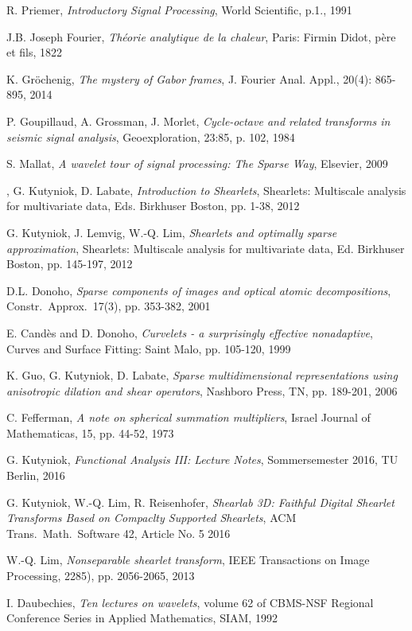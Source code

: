 \documentclass[11pt, english, singlespacing, headsepline, ]{MastersDoctoralThesis}
\theoremstyle{definition}
\begin{document}
\begin{thebibliography}{90}
	R. Priemer,
	\emph{Introductory Signal Processing},
	World Scientific, p.1.,
	1991

	J.B. Joseph Fourier,
	\emph{Théorie analytique de la chaleur},
	Paris: Firmin Didot, père et fils, 
	1822

	K. Gr\"ochenig,
	\emph{The mystery of Gabor frames},
	J. Fourier Anal. Appl., 20(4): 865-895,
	2014	

	P. Goupillaud, A. Grossman, J. Morlet,
	\emph{Cycle-octave and related transforms in seismic signal analysis},
	Geoexploration, 23:85, p. 102,
	1984

	S. Mallat,
	\emph{A wavelet tour of signal processing: The Sparse Way},
	Elsevier, 
	2009

,
	G. Kutyniok, D. Labate,
	\emph{Introduction to Shearlets},
	Shearlets: Multiscale analysis for multivariate data, Eds. Birkhuser Boston, pp. 1-38,
	2012

	G. Kutyniok, J. Lemvig, W.-Q. Lim,
	\emph{Shearlets and optimally sparse approximation},
	Shearlets: Multiscale analysis for multivariate data, Ed. Birkhuser Boston, pp. 145-197,
	2012

	D.L. Donoho,
	\emph{Sparse components of images and optical atomic decompositions},
	Constr.\ Approx.\, 17(3), pp. 353-382,
	2001

	E. Candès and D. Donoho,
	\emph{Curvelets - a surprisingly effective nonadaptive},
	Curves and Surface Fitting: Saint Malo, pp. 105-120,
	1999

	K. Guo, G. Kutyniok, D. Labate,
	\emph{Sparse multidimensional representations using anisotropic dilation and shear operators},
	Nashboro Press, TN, pp. 189-201,
	2006
	
	C. Fefferman, 
	\emph{A note on spherical summation multipliers},
	Israel Journal of Mathematicas, 15, pp. 44-52,
	1973

	G. Kutyniok,
	\emph{Functional Analysis III: Lecture Notes},
	Sommersemester 2016, TU Berlin, 
	2016

	G. Kutyniok, W.-Q. Lim, R. Reisenhofer,
	\emph{Shearlab 3D: Faithful Digital Shearlet Transforms Based on Compaclty Supported Shearlets},
	ACM Trans.\ Math.\ Software 42, Article No. 5
	2016

	W.-Q. Lim,
	\emph{Nonseparable shearlet transform},
	IEEE Transactions on Image Processing, 2285), pp. 2056-2065,
	2013

	I. Daubechies,
	\emph{Ten lectures on wavelets},
	volume 62 of CBMS-NSF Regional Conference Series in Applied Mathematics, SIAM, 
	1992

\end{thebibliography}

\end{document}

